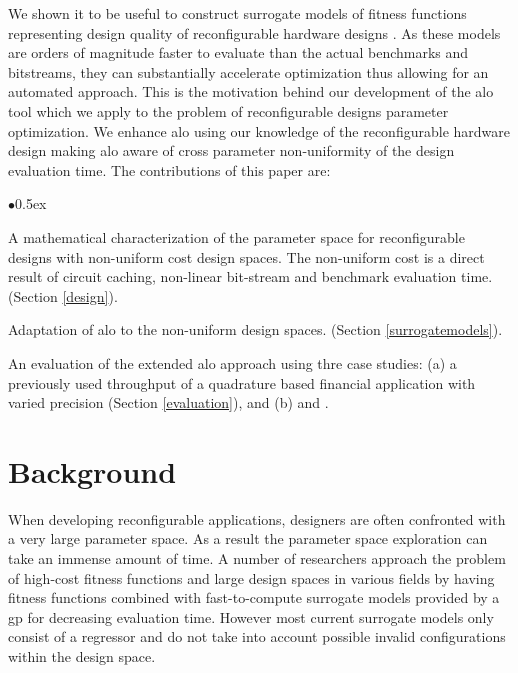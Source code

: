 \documentclass[10pt,conference,a4paper]{IEEEtran}
\begin{document}
We shown it to be useful to construct surrogate models of fitness functions representing design quality of reconfigurable hardware designs \cite{fpt2012MLO,arc2012MLO}. As these models are orders of magnitude faster to evaluate than the actual benchmarks and bitstreams, they can substantially accelerate optimization thus allowing for an automated approach. This is the motivation behind our development of the \ac{alo} tool which we apply to the problem of reconfigurable designs parameter optimization. We enhance \ac{alo} using our knowledge of the reconfigurable hardware design making \ac{alo} aware of cross parameter non-uniformity of the design evaluation time. The contributions of this paper are: 

\vspace{-0.5em}

\begin{list}{$\bullet$}{\itemsep 0.5ex}

\item A mathematical characterization of the parameter space for reconfigurable designs with non-uniform cost design spaces. The non-uniform cost is a direct result of circuit caching, non-linear bit-stream and benchmark evaluation time. (Section \ref{design}).

\item Adaptation of \ac{alo} to the non-uniform design spaces. (Section \ref{surrogatemodels}).

\item An evaluation of the extended \ac{alo} approach using thre case studies: (a) a previously used \cite{fpt2012MLO} throughput of a quadrature based financial application with varied precision (Section \ref{evaluation}), and (b) and .
\end{list}

\section{Background}

When developing reconfigurable applications, designers are often confronted with a very large parameter space. As a result the parameter space exploration can take an immense amount of time. A number of researchers approach the problem of high-cost fitness functions and large design spaces in various fields \cite{1041556,surrogateModel,Su:2008:GPA:1494644.1494688,5194095,LeThi2002258} by having fitness functions combined with fast-to-compute surrogate models provided by a \ac{gp} for decreasing evaluation time. However most current surrogate models only consist of a regressor and do not take into account possible invalid configurations within the design space. 
\end{document}
